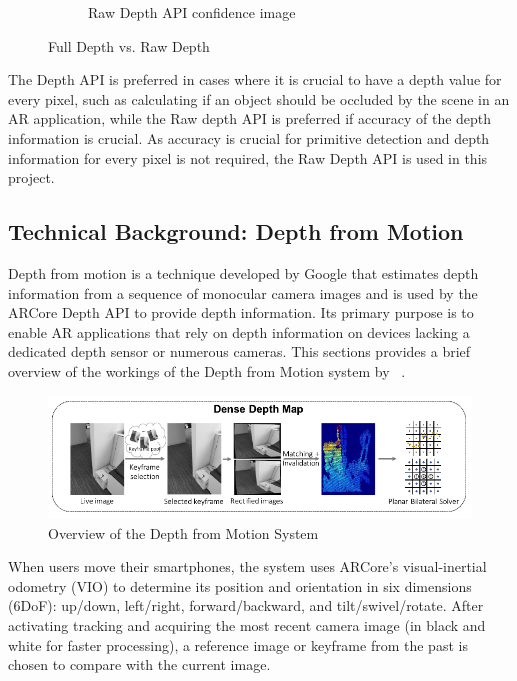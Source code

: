 \begin{figure}[ht!]
\begin{subfigure}[b]{0.4\textwidth}
        \caption{Raw Depth API confidence image}
    \end{subfigure}%

    \caption{Full Depth vs. Raw Depth}
    \label{fig:depth-api-images}
\end{figure}


The Depth API is preferred in cases where it is crucial to have a depth value for every pixel, such as calculating if an object should be occluded by the scene in an AR application,
while the Raw depth API is preferred if accuracy of the depth information is crucial.
As accuracy is crucial for primitive detection and depth information for every pixel is not required, the Raw Depth API is used in this project.

\parencite{google_llc_arcore_doc}

\subsection{Technical Background: Depth from Motion}\label{sec:technical-background-depth-from-motion}
Depth from motion is a technique developed by Google that estimates depth information from a sequence of monocular camera images
and is used by the ARCore Depth API to provide depth information.
Its primary purpose is to enable AR applications that rely on depth information on devices lacking a dedicated depth sensor or numerous cameras.
This sections provides a brief overview of the workings of the Depth from Motion system by ~\parencite{valentin_depth_2018}.

\begin{figure}[ht!]
    \centering
    \includegraphics[width=\linewidth]{images/DepthFromMotion}
    \caption{Overview of the Depth from Motion System}
\end{figure}
When users move their smartphones, the system uses ARCore's visual-inertial odometry (VIO)
to determine its position and orientation in six dimensions (6DoF): up/down, left/right, forward/backward, and tilt/swivel/rotate.
After activating tracking and acquiring the most recent camera image (in black and white for faster processing),
a reference image or keyframe from the past is chosen to compare with the current image.

